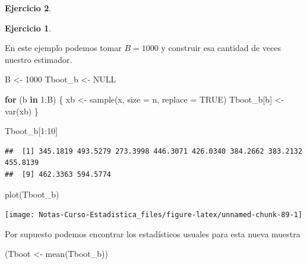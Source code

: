 \documentclass[
  12pt,
]{book}
\newenvironment{Shaded}{\begin{snugshade}}{\end{snugshade}}
\newcommand{\AttributeTok}[1]{\textcolor[rgb]{0.77,0.63,0.00}{#1}}
\newcommand{\ConstantTok}[1]{\textcolor[rgb]{0.00,0.00,0.00}{#1}}
\newcommand{\ControlFlowTok}[1]{\textcolor[rgb]{0.13,0.29,0.53}{\textbf{#1}}}
\newcommand{\DecValTok}[1]{\textcolor[rgb]{0.00,0.00,0.81}{#1}}
\newcommand{\FunctionTok}[1]{\textcolor[rgb]{0.00,0.00,0.00}{#1}}
\newcommand{\NormalTok}[1]{#1}
\newcommand{\OtherTok}[1]{\textcolor[rgb]{0.56,0.35,0.01}{#1}}
\newcommand{\SpecialCharTok}[1]{\textcolor[rgb]{0.00,0.00,0.00}{#1}}
\theoremstyle{definition}
\theoremstyle{definition}
\theoremstyle{definition}
\newtheorem{exercise}{Ejercicio}[chapter]
\theoremstyle{remark}
\begin{document}
\begin{exercise}
\begin{exercise}
\protect\hypertarget{exr:unlabeled-div-41}{}\label{exr:unlabeled-div-41}

\protect\hypertarget{exr:unnamed-chunk-87}{}{\label{exr:unnamed-chunk-87} }En este ejemplo podemos tomar \(B=1000\) y construir esa cantidad de veces nuestro estimador.

\end{exercise}
\end{exercise}

\begin{Shaded}
\begin{Highlighting}[]
\NormalTok{B }\OtherTok{\textless{}{-}} \DecValTok{1000}
\NormalTok{Tboot\_b }\OtherTok{\textless{}{-}} \ConstantTok{NULL}

\ControlFlowTok{for}\NormalTok{ (b }\ControlFlowTok{in} \DecValTok{1}\SpecialCharTok{:}\NormalTok{B) \{}
\NormalTok{    xb }\OtherTok{\textless{}{-}} \FunctionTok{sample}\NormalTok{(x, }\AttributeTok{size =}\NormalTok{ n, }\AttributeTok{replace =} \ConstantTok{TRUE}\NormalTok{)}
\NormalTok{    Tboot\_b[b] }\OtherTok{\textless{}{-}} \FunctionTok{var}\NormalTok{(xb)}
\NormalTok{\}}

\NormalTok{Tboot\_b[}\DecValTok{1}\SpecialCharTok{:}\DecValTok{10}\NormalTok{]}
\end{Highlighting}
\end{Shaded}

\begin{verbatim}
##  [1] 345.1819 493.5279 273.3998 446.3071 426.0340 384.2662 383.2132 455.8139
##  [9] 462.3363 594.5774
\end{verbatim}

\begin{Shaded}
\begin{Highlighting}[]
\FunctionTok{plot}\NormalTok{(Tboot\_b)}
\end{Highlighting}
\end{Shaded}

\begin{center}\texttt{[image: Notas-Curso-Estadistica\_files/figure-latex/unnamed-chunk-89-1]} \end{center}

Por supuesto podemos encontrar los estadísticos usuales para esta nueva muestra

\begin{Shaded}
\begin{Highlighting}[]
\NormalTok{(Tboot }\OtherTok{\textless{}{-}} \FunctionTok{mean}\NormalTok{(Tboot\_b))}
\end{Highlighting}
\end{Shaded}
\end{document}
